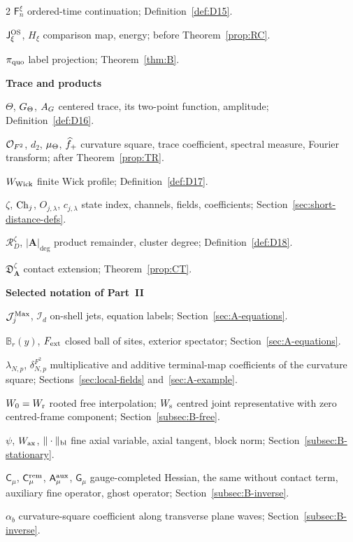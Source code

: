 \begin{multicols}{2}
$\mathsf F_n^\xi$ ordered-time continuation; Definition~\ref{def:D15}.

$\mathsf J_\xi^{\rm OS}$, $H_\xi$ comparison map, energy; before Theorem~\ref{prop:RC}.

$\pi_{\rm quo}$ label projection; Theorem~\ref{thm:B}.

\medskip\textbf{Trace and products}\par
$\Theta$, $G_{\Theta}$, $A_G$ centered trace, its two-point function, amplitude; Definition~\ref{def:D16}.

$\mathcal{O}_{F^2}$, $d_2$, $\mu_{\Theta}$, $\widehat{f}_{+}$ curvature square, trace coefficient, spectral measure, Fourier transform; after Theorem~\ref{prop:TR}.

$W_{\rm Wick}$ finite Wick profile; Definition~\ref{def:D17}.

$\zeta$, $\mathrm{Ch}_{j}$, $O_{j,\lambda}$, $c_{j,\lambda}$ state index, channels, fields, coefficients; Section~\ref{sec:short-distance-defs}.

$\mathcal R_D^\zeta$, $|\boldsymbol A|_{\deg}$ product remainder, cluster degree; Definition~\ref{def:D18}.

$\mathfrak D_{\boldsymbol A}^\zeta$ contact extension; Theorem~\ref{prop:CT}.

\medskip\textbf{Selected notation of Part~II}\par
$\mathcal J^{\rm Max}_j$, $\mathcal I_d$ on-shell jets, equation labels; Section~\ref{sec:A-equations}.

$\mathbb B_r(y)$, $F_{\rm ext}$ closed ball of sites, exterior spectator; Section~\ref{sec:A-equations}.

$\lambda_{N,p}$, $\delta^{F^2}_{N,p}$ multiplicative and additive terminal-map coefficients of the curvature square; Sections~\ref{sec:local-fields} and~\ref{sec:A-example}.

$W_0=W_{\rm r}$ rooted free interpolation; $W_{\rm s}$ centred joint representative with zero centred-frame component; Section~\ref{subsec:B-free}.

$\psi$, $W_{\rm ax}$, $\|\cdot\|_{\rm bl}$ fine axial variable, axial tangent, block norm; Section~\ref{subsec:B-stationary}.

$\mathsf C_\mu$, $\mathsf C^{\rm rem}_\mu$, $\mathsf A^{\rm aux}_\mu$, $\mathsf G_\mu$ gauge-completed Hessian, the same without contact term, auxiliary fine operator, ghost operator; Section~\ref{subsec:B-inverse}.

$\alpha_b$ curvature-square coefficient along transverse plane waves; Section~\ref{subsec:B-inverse}.


\end{multicols}
